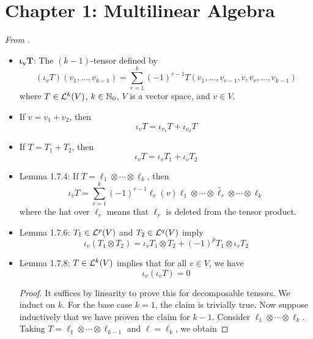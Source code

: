 \documentclass[../notes.tex]{subfiles}
\begin{document}
\section{Chapter 1: Multilinear Algebra}
\emph{From \textcite{bib:DifferentialForms}.}
\begin{itemize}
    \item {}$\bm{\iota_vT}$: The $(k-1)$-tensor defined by
    \begin{equation*}
        (\iota_vT)(v_1,\dots,v_{k-1}) = \sum_{r=1}^k(-1)^{r-1}T(v_1,\dots,v_{r-1},v,v_r,\dots,v_{k-1})
    \end{equation*}
    where $T\in\lin[k]{V}$, $k\in\N_0$, $V$ is a vector space, and $v\in V$.
    \item If $v=v_1+v_2$, then
    \begin{equation*}
        \iota_vT = \iota_{v_1}T+\iota_{v_2}T
    \end{equation*}
    \item If $T=T_1+T_2$, then
    \begin{equation*}
        \iota_vT = \iota_vT_1+\iota_vT_2
    \end{equation*}
    \item Lemma 1.7.4: If $T=\ell_1\otimes\cdots\otimes\ell_k$, then
    \begin{equation*}
        \iota_vT = \sum_{r=1}^k(-1)^{r-1}\ell_r(v)\ell_1\otimes\cdots\otimes\hat{\ell}_r\otimes\cdots\otimes\ell_k
    \end{equation*}
    where the hat over $\ell_r$ means that $\ell_r$ is deleted from the tensor product.
    \item Lemma 1.7.6: $T_1\in\lin[p]{V}$ and $T_2\in\lin[q]{V}$ imply
    \begin{equation*}
        \iota_v(T_1\otimes T_2) = \iota_vT_1\otimes T_2+(-1)^pT_1\otimes\iota_vT_2
    \end{equation*}
    \item Lemma 1.7.8: $T\in\lin[k]{V}$ implies that for all $v\in V$, we have
    \begin{equation*}
        \iota_v(\iota_vT) = 0
    \end{equation*}
    \begin{proof}
        It suffices by linearity to prove this for decomposable tensors. We induct on $k$. For the base case $k=1$, the claim is trivially true. Now suppose inductively that we have proven the claim for $k-1$. Consider $\ell_1\otimes\cdots\otimes\ell_k$. Taking $T=\ell_1\otimes\cdots\otimes\ell_{k-1}$ and $\ell=\ell_k$, we obtain

\end{proof}
\end{itemize}
\end{document}
